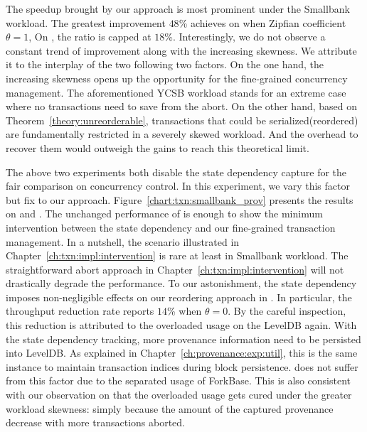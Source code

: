 The speedup brought by our approach is most prominent under the Smallbank workload. 
The greatest improvement $48$\% achieves on {\fsPrF} when Zipfian coefficient $\theta=1$,
On {\fsF}, the ratio is capped at $18$\%.
Interestingly, we do not observe a constant trend of improvement along with the increasing skewness. 
We attribute it to the interplay of the two following two factors. 
On the one hand, the increasing skewness opens up the opportunity for the fine-grained concurrency management. 
The aforementioned YCSB workload stands for an extreme case where no transactions need to save from the abort. 
On the other hand, based on Theorem~\ref{theory:unreorderable}, transactions that could be serialized(reordered) are fundamentally restricted in a severely skewed workload. 
And the overhead to recover them would outweigh the gains to reach this theoretical limit. 

The above two experiments both disable the state dependency capture for the fair comparison on concurrency control. 
In this experiment, we vary this factor but fix to our approach. 
Figure~\ref{chart:txn:smallbank_prov} presents the results on {\fsPrF} and {\fsF}. 
The unchanged performance of {\fsF} is enough to show the minimum intervention
between the state dependency and our fine-grained transaction management. 
In a nutshell, the scenario illustrated in Chapter~\ref{ch:txn:impl:intervention} is rare at least in Smallbank workload. 
The straightforward abort approach in Chapter~\ref{ch:txn:impl:intervention} will not drastically degrade the performance. 
To our astonishment, the state dependency imposes non-negligible effects on our reordering approach in {\fsPrF}.
In particular, the throughput reduction rate reports $14$\% when $\theta=0$.
By the careful inspection, this reduction is attributed to the overloaded usage on the LevelDB again. 
With the state dependency tracking, more provenance information need to be persisted into LevelDB.
As explained in Chapter~\ref{ch:provenance:exp:util}, this is the same instance to maintain transaction indices during block persistence. 
{\fsF} does not suffer from this factor due to the separated usage of ForkBase. 
This is also consistent with our observation on {\fsPrF} that 
the overloaded usage gets cured under the greater workload skewness:
simply because the amount of the captured provenance decrease with more transactions aborted. 

